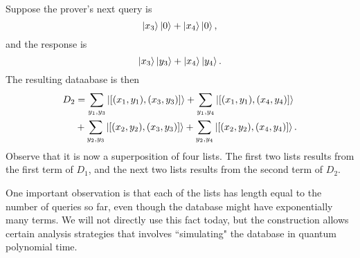 Suppose the prover's next query is 
$$\ket{x_3}\ket{0}+\ket{x_4}\ket{0},$$
and the response is
$$\ket{x_3}\ket{y_3}+\ket{x_4}\ket{y_4}.$$
The resulting dataabase is then
\begin{align*}
	D_2&=
	\sum_{y_1, y_3}\ket{[(x_1, y_1), (x_3, y_3)]}
	+ \sum_{y_1, y_4}\ket{[(x_1, y_1), (x_4, y_4)]}\\
	&+ \sum_{y_2, y_3}\ket{[(x_2, y_2), (x_3, y_3)]}
	+ \sum_{y_2, y_4}\ket{[(x_2, y_2), (x_4, y_4)]}.
\end{align*}
Observe that it is now a superposition of four lists.
The first two lists results from the first term of $D_1$,
and the next two lists results from the second term of $D_2$.

One important observation is that each of the lists has length equal to the number of queries so far,
even though the database might have exponentially many terms.
We will not directly use this fact today,
but the construction allows certain analysis strategies that involves ``simulating" the database in quantum polynomial time.
